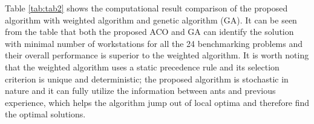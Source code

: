 Table \ref{tab:tab2} shows the computational result comparison of the proposed algorithm with weighted algorithm and genetic algorithm (GA).
It can be seen from the table that both the proposed ACO and GA can identify the solution with minimal number of workstations for all the 24 benchmarking problems and their overall performance is superior to the weighted algorithm.
It is worth noting that the weighted algorithm uses a static precedence rule and its selection criterion is unique and deterministic; the proposed algorithm is stochastic in nature and it can fully utilize the information between ants and previous experience, which helps the algorithm jump out of local optima and therefore find the optimal solutions.



\begin{table}[h!]
	\begin{center}
		\caption{Computational result comparisons on benchmark problems}
		\label{tab:tab2}
\end{center}
\end{table}
